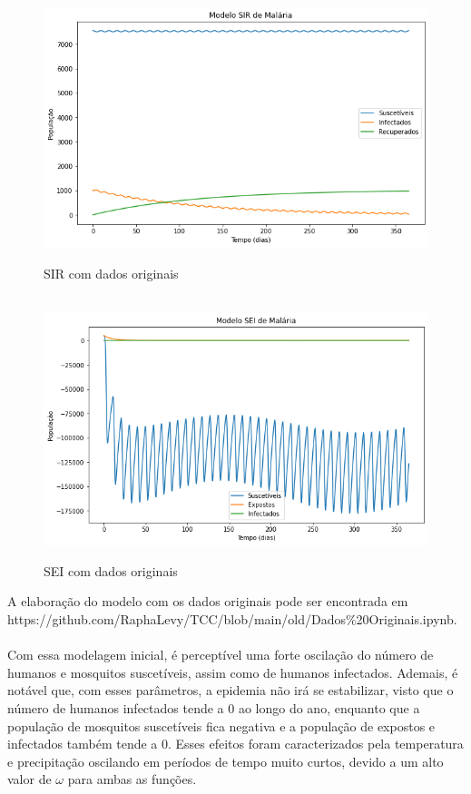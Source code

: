 \documentclass[12pt]{article}
\begin{document}
\begin{figure}[!ht]
        \centering
        \hbox{\hspace{2.8em} \includegraphics[scale=0.5] {SIR_Dados_Originais_Parham_Michael.png}}
        \caption{SIR com dados originais}
\end{figure} 
\begin{figure}[!ht]
        \centering
        \hbox{\hspace{2.0em} \includegraphics[scale=0.5] {SEI_Dados_Originais_Parham_Michael.png}}
        \caption{SEI com dados originais}
\end{figure} 
\newpage
A elaboração do modelo com os dados originais pode ser encontrada em
\\
https://github.com/RaphaLevy/TCC/blob/main/old/Dados\%20Originais.ipynb.
\\\\
Com essa modelagem inicial, é perceptível uma forte oscilação do número de humanos e mosquitos suscetíveis, assim como de humanos infectados. Ademais, é notável que, com esses parâmetros, a epidemia não irá se estabilizar, visto que o número de humanos infectados tende a 0 ao longo do ano, enquanto que a população de mosquitos suscetíveis fica negativa e a população de expostos e infectados também tende a 0. Esses efeitos foram caracterizados pela temperatura e precipitação oscilando em períodos de tempo muito curtos, devido a um alto valor de $\omega$ para ambas as funções. 
\end{document}
